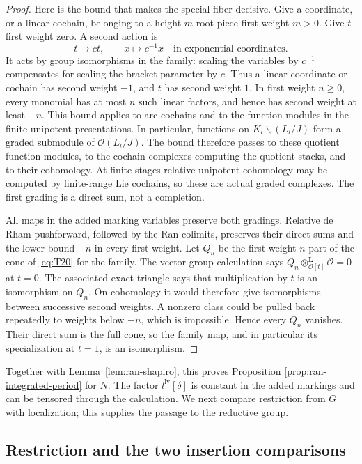 \documentclass[11pt]{article}
\numberwithin{equation}{section}
\theoremstyle{definition}
\theoremstyle{remark}
\begin{document}
\begin{proof}
Here is the bound that makes the special fiber decisive.  Give a
coordinate, or a linear cochain, belonging to a height-$m$ root piece
first weight $m>0$.  Give $t$ first weight zero.  A second action is
\[
             t\longmapsto c t,\qquad x\longmapsto c^{-1}x
             \quad\text{in exponential coordinates}.
\]
It acts by group isomorphisms in the family: scaling the variables by
$c^{-1}$ compensates for scaling the bracket parameter by $c$.
Thus a linear coordinate or cochain has second weight $-1$, and $t$ has
second weight $1$.  In first weight $n\geq0$, every monomial has at most
$n$ such linear factors, and hence has second weight at least $-n$.
This bound applies to arc cochains and to the function modules in the
finite unipotent presentations.  In particular, functions on
$K_l\backslash(L_l/J)$ form a graded submodule of
$\mathcal O(L_l/J)$.  The bound therefore passes to these quotient
function modules, to the cochain complexes computing the quotient
stacks, and to their cohomology.  At finite stages relative unipotent cohomology may be
computed by finite-range Lie cochains, so these are actual graded
complexes.  The first grading is a direct sum, not a completion.

All maps in the added marking variables preserve both gradings.  Relative
de Rham pushforward, followed by the Ran colimits, preserves their direct
sums and the lower bound $-n$ in every first weight.  Let $Q_n$ be the
first-weight-$n$ part of the cone of \eqref{eq:T20} for the family.  The
vector-group calculation says
$Q_n\otimes^{\mathbf L}_{\mathcal O[t]}\mathcal O=0$ at $t=0$.
The associated exact triangle says that multiplication by $t$ is an
isomorphism on $Q_n$.  On cohomology it would therefore give isomorphisms
between successive second weights.  A nonzero class could be pulled back
repeatedly to weights below $-n$, which is impossible.  Hence every $Q_n$
vanishes.  Their direct sum is the full cone, so the family map, and in
particular its specialization at $t=1$, is an isomorphism.
\end{proof}

Together with Lemma~\ref{lem:ran-shapiro}, this proves Proposition
\ref{prop:ran-integrated-period} for $N$.  The factor
$l^{\mathrm{lv}}[\delta]$ is constant in the added markings and can be
tensored through the calculation.  We next compare restriction from $G$
with localization; this supplies the passage to the reductive group.

\subsection{Restriction and the two insertion comparisons}
\end{document}
